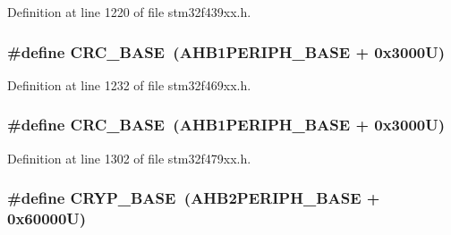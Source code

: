 Definition at line 1220 of file stm32f439xx.\+h.

\subsubsection[{\texorpdfstring{C\+R\+C\+\_\+\+B\+A\+SE}{CRC_BASE}}]{\setlength{\rightskip}{0pt plus 5cm}\#define C\+R\+C\+\_\+\+B\+A\+SE~({\bf A\+H\+B1\+P\+E\+R\+I\+P\+H\+\_\+\+B\+A\+SE} + 0x3000\+U)}\hypertarget{group___peripheral__memory__map_ga656a447589e785594cbf2f45c835ad7e}{}\label{group___peripheral__memory__map_ga656a447589e785594cbf2f45c835ad7e}


Definition at line 1232 of file stm32f469xx.\+h.

\subsubsection[{\texorpdfstring{C\+R\+C\+\_\+\+B\+A\+SE}{CRC_BASE}}]{\setlength{\rightskip}{0pt plus 5cm}\#define C\+R\+C\+\_\+\+B\+A\+SE~({\bf A\+H\+B1\+P\+E\+R\+I\+P\+H\+\_\+\+B\+A\+SE} + 0x3000\+U)}\hypertarget{group___peripheral__memory__map_ga656a447589e785594cbf2f45c835ad7e}{}\label{group___peripheral__memory__map_ga656a447589e785594cbf2f45c835ad7e}


Definition at line 1302 of file stm32f479xx.\+h.

\subsubsection[{\texorpdfstring{C\+R\+Y\+P\+\_\+\+B\+A\+SE}{CRYP_BASE}}]{\setlength{\rightskip}{0pt plus 5cm}\#define C\+R\+Y\+P\+\_\+\+B\+A\+SE~({\bf A\+H\+B2\+P\+E\+R\+I\+P\+H\+\_\+\+B\+A\+SE} + 0x60000\+U)}\hypertarget{group___peripheral__memory__map_ga019f3ad3b3212e56b45984efd8b8efef}{}\label{group___peripheral__memory__map_ga019f3ad3b3212e56b45984efd8b8efef}


